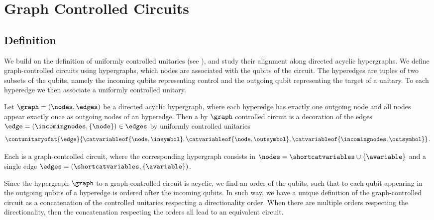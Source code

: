 \section{Graph Controlled Circuits}



\subsection{Definition}

We build on the definition of uniformly controlled unitaries (see \cite{mottonen_transformation_2005}), and study their alignment along directed acyclic hypergraphs.
We define graph-controlled circuits using hypergraphs, which nodes are associated with the qubits of the circuit.
The hyperedges are tuples of two subsets of the qubits, namely the incoming qubits representing control and the outgoing qubit representing the target of a unitary.
To each hyperedge we then associate a uniformly controlled unitary.

\begin{definition}
    Let $\graph=(\nodes,\edges)$ be a directed acyclic hypergraph, where each hyperedge has exactly one outgoing node and all nodes appear exactly once as outgoing nodes of an hyperedge.
    Then a by $\graph$ controlled circuit is a decoration of the edges $\edge=(\incomingnodes,\{\node\})\in\edges$ by uniformly controlled unitaries
    \begin{align*}
        \contunitaryofat{\edge}{\catvariableof{\node,\insymbol},\catvariableof{\node,\outsymbol},\catvariableof{\incomingnodes,\outsymbol}} \, .
    \end{align*}
\end{definition}

\begin{example}
    Each \activationCircuit{} is a graph-controlled circuit, where the corresponding hypergraph consists in $\nodes=\shortcatvariables\cup\{\avariable\}$ and a single edge $\edges=(\shortcatvariables,\{\avariable\})$.
\end{example}

Since the hypergraph $\graph$ to a graph-controlled circuit is acyclic, we find an order of the qubits, such that to each qubit appearing in the outgoing qubits of a hyperedge is ordered after the incoming qubits.
In such way, we have a unique definition of the graph-controlled circuit as a concatenation of the controlled unitaries respecting a directionality order.
When there are multiple orders respecting the directionality, then the concatenation respecting the orders all lead to an equivalent circuit.

